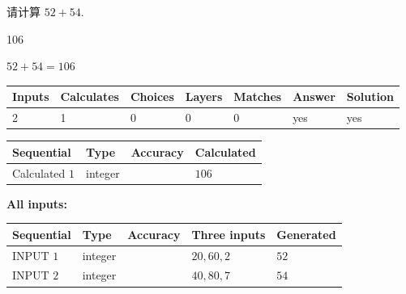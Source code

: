 \documentclass{ctexart}
\begin{document}
  
 
请计算 $ %
52 +  %
54 $.
 
 
 
\noindent{}
 
 

106
 
 
\noindent{}
 
 

 
 
 
\noindent{}
 
 

$ %
52 +  %
54=   %
106$
 
 
\noindent{}
 
 

 
   
   
   
   
\noindent\begin{tabular}{|l|l|l|l|l|l|l|}
 \hline
Inputs & Calculates & Choices & Layers & Matches & Answer & Solution \\ \hline
 2  & 
 1  & 
 0
  & 
 0  & 
 0  & 
  yes & 
  yes 
  \\ \hline
 \end{tabular}
   
   
   
   
\noindent{}
   
   
  
  
\noindent\begin{tabular}{|l|l|l|l|}
\hline
 Sequential & Type & Accuracy & Calculated \\ 
\hline
 
 
  Calculated $  1 $ & integer &  & 
  $ 106 $ 
 \\  \hline  
 \end{tabular}
   
   
   
   
\noindent\vspace{0.1in}\hspace{-0.08in} {\textbf{\Large{All inputs: }}}
   
   
  
  
\noindent\begin{tabular}{|l|l|l|l|l|}
\hline
 Sequential & Type & Accuracy & Three inputs & Generated \\ 
\hline
 
 
  INPUT $  1 $ & integer &  & $
 20
 , 
 60
 , 
 2
 $ & $ 52 $ 
 \\  \hline  
 
 
  INPUT $  2 $ & integer &  & $
 40
 , 
 80
 , 
 7
 $ & $ 54 $ 
 \\  \hline  
 \end{tabular}
   
\end{document}
